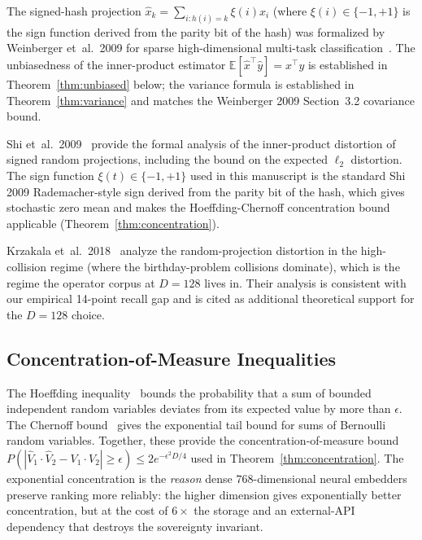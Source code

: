 \documentclass[10pt,twocolumn]{article}
\theoremstyle{definition}
\theoremstyle{remark}
\begin{document}
The signed-hash projection $\hat{x}_k = \sum_{i: h(i)=k} \xi(i) x_i$ (where
$\xi(i) \in \{-1, +1\}$ is the sign function derived from the parity bit of
the hash) was formalized by Weinberger et~al.\ 2009 for sparse
high-dimensional multi-task classification~\citep{weinberger2009feature}.
The unbiasedness of the inner-product estimator
$\mathbb{E}[\hat{x}^\top \hat{y}] = x^\top y$ is established in
Theorem~\ref{thm:unbiased} below; the variance formula is established in
Theorem~\ref{thm:variance} and matches the Weinberger 2009 Section~3.2
covariance bound.

Shi et~al.\ 2009~\citep{shi2009hash} provide the formal analysis of the
inner-product distortion of signed random projections, including the
bound on the expected $\ell_2$ distortion. The sign function $\xi(t) \in
\{-1, +1\}$ used in this manuscript is the standard Shi 2009
Rademacher-style sign derived from the parity bit of the hash, which
gives stochastic zero mean and makes the Hoeffding-Chernoff concentration
bound applicable (Theorem~\ref{thm:concentration}).

Krzakala et~al.\ 2018~\citep{krzakala2018phase} analyze the
random-projection distortion in the high-collision regime (where the
birthday-problem collisions dominate), which is the regime the operator
corpus at $D = 128$ lives in. Their analysis is consistent with our
empirical 14-point recall gap and is cited as additional theoretical
support for the $D = 128$ choice.

\subsection{Concentration-of-Measure Inequalities}

The Hoeffding inequality~\citep{hoeffding1963} bounds the probability that
a sum of bounded independent random variables deviates from its expected
value by more than $\epsilon$. The Chernoff bound~\citep{chernoff1952}
gives the exponential tail bound for sums of Bernoulli random variables.
Together, these provide the concentration-of-measure bound
$P(|\hat{V}_1 \cdot \hat{V}_2 - V_1 \cdot V_2| \ge \epsilon) \le 2
e^{-\epsilon^2 D / 4}$ used in Theorem~\ref{thm:concentration}. The
exponential concentration is the \emph{reason} dense $768$-dimensional
neural embedders preserve ranking more reliably: the higher dimension
gives exponentially better concentration, but at the cost of $6\times$
the storage and an external-API dependency that destroys the sovereignty
invariant.
\end{document}
